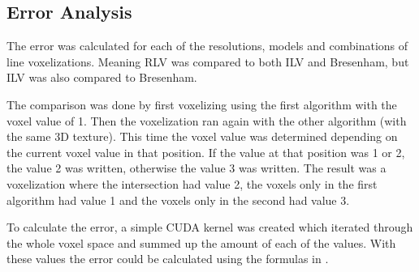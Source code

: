 \newpage

\subsection{Error Analysis}
The error was calculated for each of the resolutions, models and combinations of line voxelizations.
Meaning RLV was compared to both ILV and Bresenham, but ILV was also compared to Bresenham.

The comparison was done by first voxelizing using the first algorithm with the voxel value of 1.
Then the voxelization ran again with the other algorithm (with the same 3D texture). 
This time the voxel value was determined depending on the current voxel value in that position.
If the value at that position was 1 or 2, the value 2 was written, otherwise the value 3 was written.
The result was a voxelization where the intersection had value 2, the voxels only in the first algorithm had value 1 and the voxels only in the second had value 3.

To calculate the error, a simple CUDA kernel was created which iterated through the whole voxel space and summed up the amount of each of the values.
With these values the error could be calculated using the formulas in .
